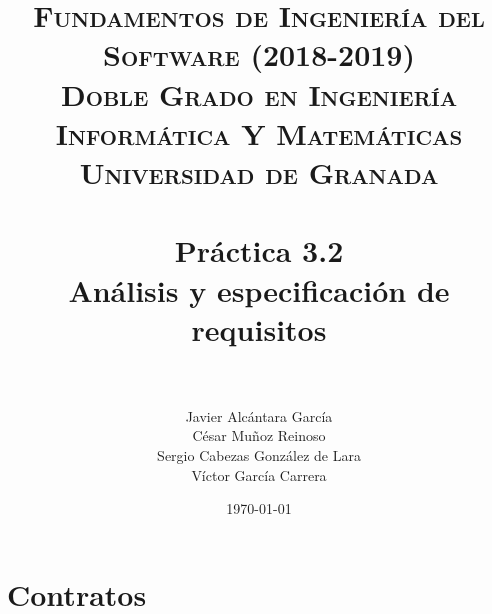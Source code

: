 


\graphicspath{{images/}}


\title{	
\normalfont \normalsize 
\textsc{\textbf{Fundamentos de Ingeniería del Software (2018-2019)} \\ Doble Grado en Ingeniería Informática Y Matemáticas \\ Universidad de Granada} \\ [25pt] %
\horrule{0.5pt} \\[0.4cm] %
\huge \textbf{Práctica 3.2} \\ Análisis y especificación de requisitos \\ %
\horrule{2pt} \\[0.5cm] %
}

\author{Javier Alcántara García\\ César Muñoz Reinoso \\ Sergio Cabezas González de Lara \\ Víctor García Carrera} %

\date{\normalsize\today} %





\maketitle %

\newpage %

\tableofcontents %

\newpage

\section{Contratos}
